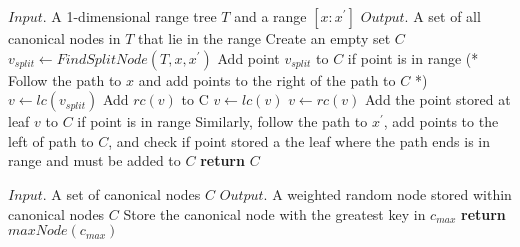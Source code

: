 \documentclass{article}
\begin{document}
\begin{algorithm}
\caption{$FindCanonicalSet(T,[x:x^\prime]$}
\begin{algorithmic}[1]
    \Statex $Input.$ A 1-dimensional range tree $T$ and a range $[x:x^\prime]$
    \Statex $Output.$ A set of all canonical nodes in $T$ that lie in the range
    \State Create an empty set $C$
    \State $v_{split} \gets FindSplitNode(T, x, x^\prime)$
        \State Add point $v_{split}$ to $C$ if point is in range 
    \Else
        \State (* Follow the path to $x$ and add points to the right of the path to $C$ *)
        \State $v \gets lc(v_{split})$
                \State Add $rc(v)$ to C
                \State $v \gets lc(v)$
            \Else 
                \State $v \gets rc(v)$
            \EndIf
        \EndWhile
        \State Add the point stored at leaf $v$ to $C$ if point is in range
        \State Similarly, follow the path to $x^\prime$, add points to the left of path to $C$, and \Statex \hspace{11.5 pt} check if point stored a the leaf where the path ends is in range and must \Statex \hspace{11.5 pt} be added to $C$
    \EndIf
    \State \textbf{return} $C$
\end{algorithmic}
\end{algorithm}

\begin{algorithm}
\caption{$WeightedRandomColorNode(C)$}
\begin{algorithmic}[1]
    \Statex $Input.$ A set of canonical nodes $C$
    \Statex $Output.$ A weighted random node stored within canonical nodes $C$
    \State Store the canonical node with the greatest key in $c_{max}$
    \State \textbf{return} $maxNode(c_{max})$ 
\end{algorithmic}
\end{algorithm}
\end{document}
